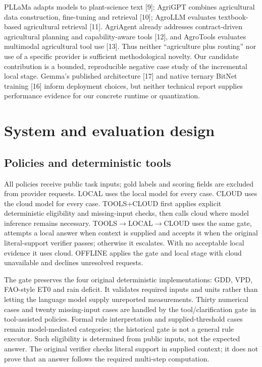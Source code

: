 \documentclass[10pt,a4paper,twocolumn]{article}
\begin{document}
PLLaMa adapts models to plant-science text [9]; AgriGPT combines agricultural data construction, fine-tuning and retrieval [10]; AgroLLM evaluates textbook-based agricultural retrieval [11]. AgriAgent already addresses contract-driven agricultural planning and capability-aware tools [12], and AgroTools evaluates multimodal agricultural tool use [13]. Thus neither ``agriculture plus routing'' nor use of a specific provider is sufficient methodological novelty. Our candidate contribution is a bounded, reproducible negative case study of the incremental local stage. Gemma's published architecture [17] and native ternary BitNet training [16] inform deployment choices, but neither technical report supplies performance evidence for our concrete runtime or quantization.

\section{System and evaluation design}

\subsection{Policies and deterministic tools}

All policies receive public task inputs; gold labels and scoring fields are excluded from provider requests. LOCAL uses the local model for every case. CLOUD uses the cloud model for every case. TOOLS+CLOUD first applies explicit deterministic eligibility and missing-input checks, then calls cloud where model inference remains necessary. TOOLS\ensuremath{\to}LOCAL\ensuremath{\to}CLOUD uses the same gate, attempts a local answer when context is supplied and accepts it when the original literal-support verifier passes; otherwise it escalates. With no acceptable local evidence it uses cloud. OFFLINE applies the gate and local stage with cloud unavailable and declines unresolved requests.

The gate preserves the four original deterministic implementations: GDD, VPD, FAO-style ET0 and rain deficit. It validates required inputs and units rather than letting the language model supply unreported measurements. Thirty numerical cases and twenty missing-input cases are handled by the tool/clarification gate in tool-assisted policies. Formal rule interpretation and supplied-threshold cases remain model-mediated categories; the historical gate is not a general rule executor. Such eligibility is determined from public inputs, not the expected answer. The original verifier checks literal support in supplied context; it does not prove that an answer follows the required multi-step computation.
\end{document}
